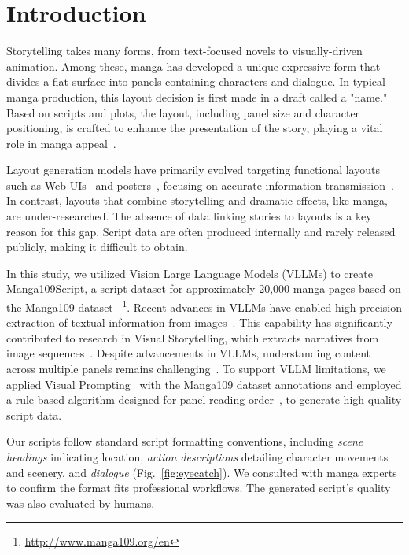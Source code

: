\documentclass[sigconf, screen, review, anonymous]{acmart}
\begin{document}
\section{Introduction}
Storytelling takes many forms, from text-focused novels to visually-driven animation. Among these, manga has developed a unique expressive form that divides a flat surface into panels containing characters and dialogue. In typical manga production, this layout decision is first made in a draft called a "name." Based on scripts and plots, the layout, including panel size and character positioning, is crafted to enhance the presentation of the story, playing a vital role in manga appeal~\cite{fukaya_mangalayout}.

Layout generation models have primarily evolved targeting functional layouts such as Web UIs~\cite{Kikuchi2021_webUI_layout} and posters~\cite{tanaka_scipostlayout_2024, advertising_posters}, focusing on accurate information transmission~\cite{shi_intelligent_2023}. In contrast, layouts that combine storytelling and dramatic effects, like manga, are under-researched.
The absence of data linking stories to layouts is a key reason for this gap.
Script data are often produced internally and rarely released publicly, making it difficult to obtain. 

In this study, we utilized Vision Large Language Models (VLLMs) to create Manga109Script, a script dataset for approximately 20,000 manga pages based on the Manga109 dataset ~\cite{matsui2017sketch,aizawa_building_2020}\footnote{\url{http://www.manga109.org/en}}.
Recent advances in VLLMs have enabled high-precision extraction of textual information from images~\cite{zhang_vision-language_2024}. This capability has significantly contributed to research in Visual Storytelling, which extracts narratives from image sequences~\cite{oliveira_story_2024, li_benchmark_2025}.
Despite advancements in VLLMs, understanding content across multiple panels remains challenging~\cite{ikuta_mangaub_2024,vivoli_comicap_2024}.
To support VLLM limitations, we applied Visual Prompting~\cite{shtedritski_what_2023} with the Manga109 dataset annotations and employed a rule-based algorithm designed for panel reading order~\cite{sachdeva_manga_2024}, to generate high-quality script data.

Our scripts follow standard script formatting conventions, including {\it scene headings} indicating location, {\it action descriptions} detailing character movements and scenery, and {\it dialogue} (Fig.~\ref{fig:eyecatch}).
We consulted with manga experts to confirm the format fits professional workflows.
The generated script's quality was also evaluated by humans.
\end{document}

